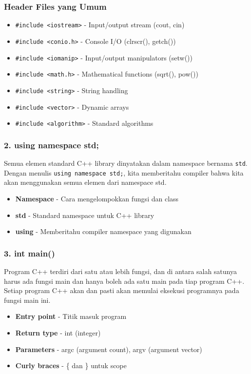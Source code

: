 \subsubsection{Header Files yang Umum}

\begin{itemize}
\item \texttt{\#include <iostream>} - Input/output stream (cout, cin)
\item \texttt{\#include <conio.h>} - Console I/O (clrscr(), getch())
\item \texttt{\#include <iomanip>} - Input/output manipulators (setw())
\item \texttt{\#include <math.h>} - Mathematical functions (sqrt(), pow())
\item \texttt{\#include <string>} - String handling
\item \texttt{\#include <vector>} - Dynamic arrays
\item \texttt{\#include <algorithm>} - Standard algorithms
\end{itemize}

\subsubsection{2. using namespace std;}

Semua elemen standard C++ library dinyatakan dalam namespace bernama \texttt{std}. Dengan menulis \texttt{using namespace std;}, kita memberitahu compiler bahwa kita akan menggunakan semua elemen dari namespace std.

\begin{itemize}
\item \textbf{Namespace} - Cara mengelompokkan fungsi dan class
\item \textbf{std} - Standard namespace untuk C++ library
\item \textbf{using} - Memberitahu compiler namespace yang digunakan
\end{itemize}

\subsubsection{3. int main()}

Program C++ terdiri dari satu atau lebih fungsi, dan di antara salah satunya harus ada fungsi main dan hanya boleh ada satu main pada tiap program C++. Setiap program C++ akan dan pasti akan memulai eksekusi programnya pada fungsi main ini.

\begin{itemize}
\item \textbf{Entry point} - Titik masuk program
\item \textbf{Return type} - int (integer)
\item \textbf{Parameters} - argc (argument count), argv (argument vector)
\item \textbf{Curly braces} - \{ dan \} untuk scope
\end{itemize}

